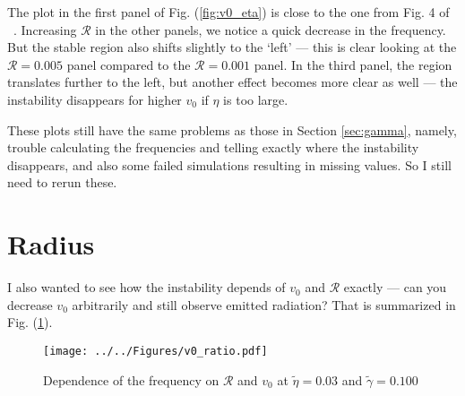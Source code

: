 \documentclass[12pt]{article}
\begin{document}
	The plot in the first panel of Fig. (\ref{fig:v0_eta}) is close to the one from Fig. 4 of ~\cite{Mendl2019}.  Increasing $\mathcal{R}$ in the other panels, we notice a quick decrease in the frequency.  But the stable region also shifts slightly to the `left' --- this is clear looking at the $\mathcal{R} = 0.005$ panel compared to the $\mathcal{R}=0.001$ panel.  In the third panel, the region translates further to the left, but another effect becomes more clear as well --- the instability disappears for higher $v_0$ if $\eta$ is too large.
	
	These plots still have the same problems as those in Section \ref{sec:gamma}, namely, trouble calculating the frequencies and telling exactly where the instability disappears, and also some failed simulations resulting in missing values.  So I still need to rerun these.
	
	\section{Radius}
	I also wanted to see how the instability depends of $v_0$ and $\mathcal{R}$ exactly --- can you decrease $v_0$ arbitrarily and still observe emitted radiation? That is summarized in Fig. (\ref{fig:v0_ratio}).
	
	\begin{figure}[H]
		\centering
		\texttt{[image: ../../Figures/v0\_ratio.pdf]}
		\caption{Dependence of the frequency on $\mathcal{R}$ and $v_0$ at $\tilde{\eta}=0.03$ and $\tilde{\gamma} = 0.100$}\label{fig:v0_ratio}
	\end{figure}
	
	
{}

\end{document}

